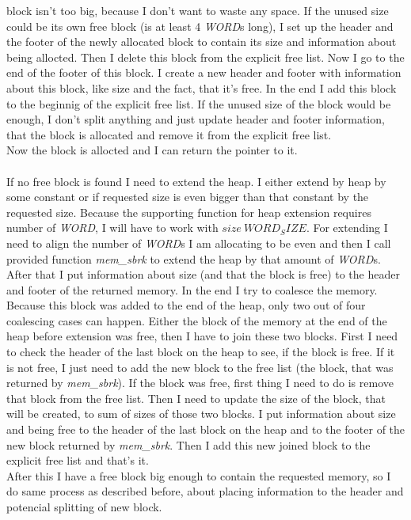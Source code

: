 \documentclass[a4paper]{article}
\begin{document}
block isn't too big, because I don't want to waste any space. 
If the unused size could be 
its own free block (is at least 4 \textit{WORD}s long), I set up the header and the footer 
of the newly allocated
block to contain its size and information about being allocted. 
Then I delete this block from the explicit free list. 
Now I go to the end of the footer of this block. I create
a new header and footer with information about this block, like size and the fact, that it's free.
In the end I add this block to the beginnig of the explicit free list. 
If the unused size of the block would be enough, I don't split anything
and just update header and footer information, that the block is allocated and remove it from
the explicit free list. \\
Now the block is allocted and I can return the pointer to it. \\

\\
If no free block is found I need to extend the heap. I either extend by heap by some constant or
if requested size is even bigger than that constant by the requested size. Because the supporting 
function for heap extension requires number of \textit{WORD}, I will have to work 
with $size \ WORD_SIZE$. 
For extending I need to align the 
number of \textit{WORD}s I am allocating to be even and then I call provided function 
\textit{mem\_sbrk}
to extend the heap by that amount of \textit{WORD}s. After that I put information 
about size (and that the block
is free) to the header and footer of the returned memory. In the end I try to coalesce the memory.
Because this block was added to the end of the heap, only two out of four coalescing cases can happen.
Either the block of the memory at the end of the heap before extension
was free, then I have to join these two blocks. First I need to check the header of the last 
block on the heap to see, if the block is free. If it is not free, I just need to add the  
new block to the free list (the block, that was returned by \textit{mem\_sbrk}).
If the block was free, first thing I need to do is remove that block from the free list.
Then I need to update the size of the block, that will be created, to sum of sizes of those
two blocks. I put information about size and being free to the header of the last block on the heap
and to the footer of the new block returned by \textit{mem\_sbrk}. Then I add this new joined
block to the explicit free list and that's it.
\\ 
After this I have a free block big enough to contain the requested memory, so I do same process as
described before, about placing information to the header and potencial splitting of new block.
\end{document}

